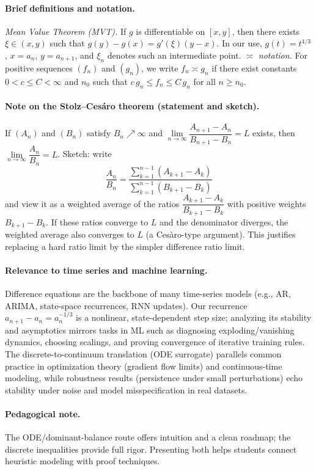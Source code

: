 \documentclass{article}
\begin{document}
\paragraph{Brief definitions and notation.}
\emph{Mean Value Theorem (MVT).} If $g$ is differentiable on $[x,y]$, then there exists $\xi\in(x,y)$ such that $g(y)-g(x)=g'(\xi)(y-x)$. In our use, $g(t)=t^{4/3}$, $x=a_n$, $y=a_{n+1}$, and $\xi_n$ denotes such an intermediate point.\newline
\emph{$\asymp$ notation.} For positive sequences $(f_n)$ and $(g_n)$, we write $f_n\asymp g_n$ if there exist constants $0<c\le C<\infty$ and $n_0$ such that $c\,g_n\le f_n\le C\,g_n$ for all $n\ge n_0$.

\paragraph{Note on the Stolz--Ces\'aro theorem (statement and sketch).}
If $(A_n)$ and $(B_n)$ satisfy $B_n\nearrow\infty$ and $\lim\limits_{n\to\infty}\dfrac{A_{n+1}-A_n}{B_{n+1}-B_n}=L$ exists, then $\lim\limits_{n\to\infty}\dfrac{A_n}{B_n}=L$. Sketch: write
$$\frac{A_n}{B_n}=\frac{\sum_{k=1}^{n-1}(A_{k+1}-A_k)}{\sum_{k=1}^{n-1}(B_{k+1}-B_k)}$$
and view it as a weighted average of the ratios $\dfrac{A_{k+1}-A_k}{B_{k+1}-B_k}$ with positive weights $B_{k+1}-B_k$. If these ratios converge to $L$ and the denominator diverges, the weighted average also converges to $L$ (a Ces\`aro-type argument). This justifies replacing a hard ratio limit by the simpler difference ratio limit.

\paragraph{Relevance to time series and machine learning.}
Difference equations are the backbone of many time-series models (e.g., AR, ARIMA, state-space recurrences, RNN updates). Our recurrence $a_{n+1}-a_n=a_n^{-1/3}$ is a nonlinear, state-dependent step size; analyzing its stability and asymptotics mirrors tasks in ML such as diagnosing exploding/vanishing dynamics, choosing scalings, and proving convergence of iterative training rules. The discrete-to-continuum translation (ODE surrogate) parallels common practice in optimization theory (gradient flow limits) and continuous-time modeling, while robustness results (persistence under small perturbations) echo stability under noise and model misspecification in real datasets.

\paragraph{Pedagogical note.}
The ODE/dominant-balance route offers intuition and a clean roadmap; the discrete inequalities provide full rigor. Presenting both helps students connect heuristic modeling with proof techniques.
\end{document}
